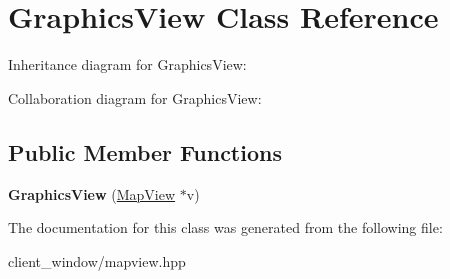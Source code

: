 \hypertarget{classGraphicsView}{}\section{Graphics\+View Class Reference}
\label{classGraphicsView}


Inheritance diagram for Graphics\+View\+:


Collaboration diagram for Graphics\+View\+:
\subsection*{Public Member Functions}
\begin{DoxyCompactItemize}
\item 
{\bfseries Graphics\+View} (\hyperlink{classMapView}{Map\+View} $\ast$v)\hypertarget{classGraphicsView_a28152832a422a967a42dc6ec2113126e}{}\label{classGraphicsView_a28152832a422a967a42dc6ec2113126e}

\end{DoxyCompactItemize}


The documentation for this class was generated from the following file\+:\begin{DoxyCompactItemize}
\item 
client\+\_\+window/mapview.\+hpp\end{DoxyCompactItemize}
